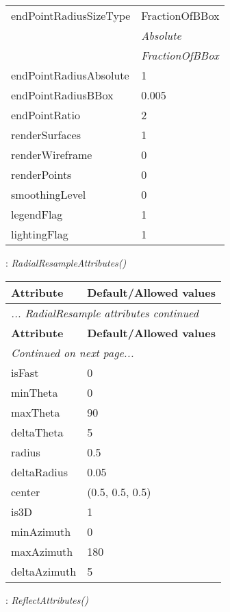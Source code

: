 \documentclass[10pt,a4paper]{report}
\begin{document}
\begin{longtable}{ll}
endPointRadiusSizeType  &  FractionOfBBox   \\
 & {\it  Absolute} \\
 & {\it  FractionOfBBox} \\
endPointRadiusAbsolute  &  1 \\
endPointRadiusBBox  &  0.005 \\
endPointRatio  &  2 \\
renderSurfaces  &  1 \\
renderWireframe  &  0 \\
renderPoints  &  0 \\
smoothingLevel  &  0 \\
legendFlag  &  1 \\
lightingFlag  &  1 \\
\end{longtable}

\newpage

{}
: {\it RadialResampleAttributes() }\\[-3mm]

\begin{longtable}{ll}
{\bf Attribute} & {\bf Default/Allowed values} \\
\hline \hline
\endfirsthead
\multicolumn{2}{l}{{\it ... RadialResample attributes continued}} \\
{\bf Attribute} & {\bf Default/Allowed values} \\
\hline \hline
\endhead
\hline
\multicolumn{2}{l}{{\it Continued on next page...}} \\
\endfoot
\hline
\endlastfoot

isFast  &  0 \\
minTheta  &  0 \\
maxTheta  &  90 \\
deltaTheta  &  5 \\
radius  &  0.5 \\
deltaRadius  &  0.05 \\
center  &  (0.5, 0.5, 0.5) \\
is3D  &  1 \\
minAzimuth  &  0 \\
maxAzimuth  &  180 \\
deltaAzimuth  &  5 \\
\end{longtable}

\newpage

{}
: {\it ReflectAttributes() }\\[-3mm]
\end{document}
